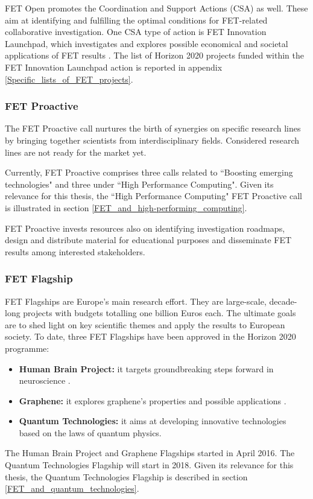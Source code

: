 FET Open promotes the Coordination and Support Actions (CSA) as well. These aim at identifying and fulfilling the optimal conditions for FET-related collaborative investigation. One CSA type of action is FET Innovation Launchpad, which investigates and explores possible economical and societal applications of FET results \cite{FETLaunchpad}. The list of Horizon 2020 projects funded within the FET Innovation Launchpad action is reported in appendix \ref{Specific_lists_of_FET_projects}. 

\subsubsection{FET Proactive}
The FET Proactive call nurtures the birth of synergies on specific research lines by bringing together scientists from interdisciplinary fields. Considered research lines are not ready for the market yet.    

Currently, FET Proactive comprises three calls related to ``Boosting emerging technologies" and three under ``High Performance Computing". Given its relevance for this thesis, the ``High Performance Computing" FET Proactive call is illustrated in section \ref{FET_and_high-performing_computing}. 

FET Proactive invests resources also on identifying investigation roadmaps, design and distribute material for educational purposes and disseminate FET results among interested stakeholders.  

\subsubsection{FET Flagship}
FET Flagships are Europe's main research effort. They are large-scale, decade-long projects with budgets totalling one billion Euros each. The ultimate goals are to shed light on key scientific themes and apply the results to European society. To date, three FET Flagships have been approved in the Horizon 2020 programme: 

\begin{itemize}
 \item \textbf{Human Brain Project:} it targets groundbreaking steps forward in neuroscience \cite{HBP}.
 \item \textbf{Graphene:} it explores graphene's properties and possible applications \cite{Graphene}.
 \item \textbf{Quantum Technologies:} it aims at developing innovative technologies based on the laws of quantum physics.
\end{itemize}
The Human Brain Project and Graphene Flagships started in April 2016. The Quantum Technologies Flagship will start in 2018. Given its relevance for this thesis, the Quantum Technologies Flagship is described in section \ref{FET_and_quantum_technologies}.

